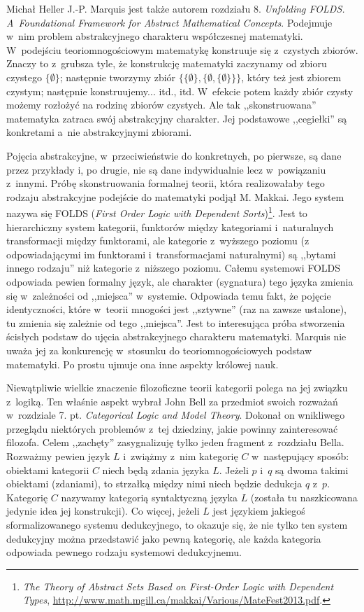 \begin{recplenv}{Michał Heller}
J.-P. Marquis jest także autorem rozdziału 8. \textit{Unfolding FOLDS. A~Foundational Framework for Abstract Mathematical Concepts}. Podejmuje w~nim problem abstrakcyjnego charakteru współczesnej matematyki. W~podejściu teoriomnogościowym matematykę konstruuje się z~czystych zbiorów. Znaczy to z~grubsza tyle, że konstrukcję matematyki zaczynamy od zbioru czystego $\{\emptyset \}$; następnie tworzymy zbiór $\{ \{\emptyset \}, \{ \emptyset , \{ \emptyset \} \} \} $, który też jest zbiorem czystym; następnie konstruujemy... itd., itd. W~efekcie potem każdy zbiór czysty możemy rozłożyć na rodzinę zbiorów czystych. Ale tak ,,skonstruowana'' matematyka zatraca swój abstrakcyjny charakter. Jej podstawowe ,,cegiełki'' są konkretami a~nie abstrakcyjnymi zbiorami.

Pojęcia abstrakcyjne, w~przeciwieństwie do konkretnych, po pierwsze, są dane przez przykłady i, po drugie, nie są dane indywidualnie lecz w~powiązaniu z~innymi. Próbę skonstruowania formalnej teorii, która realizowałaby tego rodzaju abstrakcyjne podejście do matematyki podjął M. Makkai. Jego system nazywa się FOLDS (\textit{First Order Logic with Dependent Sorts})\footnote{\textit{The Theory of Abstract Sets Based on First-Order Logic with Dependent Types}, \url{http://www.math.mgill.ca/makkai/Various/MateFest2013.pdf}.}. Jest to hierarchiczny system kategorii, funktorów między kategoriami i~naturalnych transformacji między funktorami, ale kategorie z~wyższego poziomu (z odpowiadającymi im funktorami i~transformacjami naturalnymi) są ,,bytami innego rodzaju'' niż kategorie z~niższego poziomu. Całemu systemowi FOLDS odpowiada pewien formalny język, ale charakter (sygnatura) tego języka zmienia się w~zależności od ,,miejsca'' w~systemie. Odpowiada temu fakt, że pojęcie identyczności, które w~teorii mnogości jest ,,sztywne'' (raz na zawsze ustalone), tu zmienia się zależnie od tego ,,miejsca''. Jest to interesująca próba stworzenia ścisłych podstaw do ujęcia abstrakcyjnego charakteru matematyki. Mar\-quis nie uważa jej za konkurencję w~stosunku do teoriomnogościowych podstaw matematyki. Po prostu ujmuje ona inne aspekty królowej nauk.

Niewątpliwie wielkie znaczenie filozoficzne teorii kategorii polega na jej związku z~logiką. Ten właśnie aspekt wybrał John Bell za przedmiot swoich rozważań w~rozdziale 7. pt. \textit{Categorical Logic and Model Theory}. Dokonał on wnikliwego przeglądu niektórych problemów z~tej dziedziny, jakie powinny zainteresować filozofa. Celem ,,zachęty'' zasygnalizuję tylko jeden fragment z~rozdziału Bella. Rozważmy pewien język $L$ i~zwiążmy z~nim kategorię $C$ w~następujący sposób: obiektami kategorii $C$ niech będą zdania języka $L$. Jeżeli $p$ i~$q$ są dwoma takimi obiektami (zdaniami), to strzałką między nimi niech będzie dedukcja $q$ z~$p$. Kategorię  $C$ nazywamy kategorią syntaktyczną języka $L$ (została tu naszkicowana jedynie idea jej konstrukcji). Co więcej, jeżeli $L$ jest językiem jakiegoś sformalizowanego systemu dedukcyjnego, to okazuje się, że nie tylko ten system dedukcyjny można przedstawić jako pewną kategorię, ale każda kategoria odpowiada pewnego rodzaju systemowi dedukcyjnemu. 


\end{recplenv}
